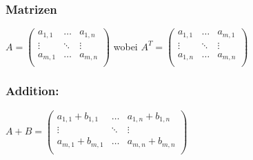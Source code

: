 \begin{framed} [Rechenregeln]
    \subsubsection*{Matrizen}
      \begin{center}
        $A = 
        \begin{pmatrix}
          a_{1,1} & \dots  & a_{1,n} \\
          \vdots  & \ddots & \vdots  \\
          a_{m,1} & \dots  & a_{m,n} \\
        \end{pmatrix}$
        wobei
        $A^T =
        \begin{pmatrix}
          a_{1,1} & \dots  & a_{m,1} \\
          \vdots  & \ddots & \vdots  \\
          a_{1,n} & \dots  & a_{m,n} \\
        \end{pmatrix}$
      \end{center}
    
    \subsubsection*{Addition:}
      \begin{center}
        $A + B =
        \begin{pmatrix}
          a_{1,1} + b_{1,1} & \dots  & a_{1,n} + b_{1,n} \\
          \vdots  	        & \ddots & 		 \vdots        \\
          a_{m,1} + b_{m,1} & \dots  & a_{m,n} + b_{m,n} \\
        \end{pmatrix}$
      \end{center}


\end{framed}
